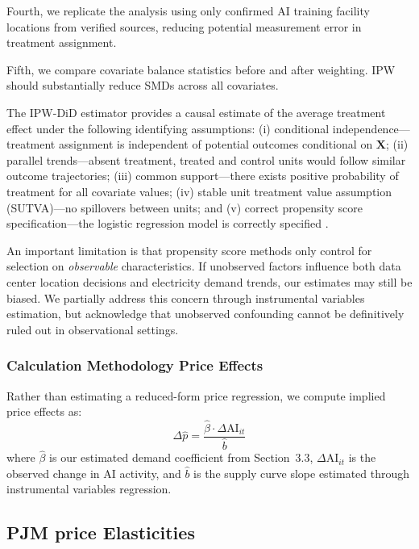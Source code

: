 \documentclass[a4paper,fleqn,longmktitle]{cas-sc}
\begin{document}
Fourth, we replicate the analysis using only confirmed AI training facility locations from verified sources, reducing potential measurement error in treatment assignment.

Fifth, we compare covariate balance statistics before and after weighting. IPW should substantially reduce SMDs across all covariates.

The IPW-DiD estimator provides a causal estimate of the average treatment effect under the following identifying assumptions: (i) conditional independence---treatment assignment is independent of potential outcomes conditional on $\mathbf{X}$; (ii) parallel trends---absent treatment, treated and control units would follow similar outcome trajectories; (iii) common support---there exists positive probability of treatment for all covariate values; (iv) stable unit treatment value assumption (SUTVA)---no spillovers between units; and (v) correct propensity score specification---the logistic regression model is correctly specified \citep{abadie2005semiparametric, callaway2021difference}.

An important limitation is that propensity score methods only control for selection on \emph{observable} characteristics. If unobserved factors influence both data center location decisions and electricity demand trends, our estimates may still be biased. We partially address this concern through instrumental variables estimation, but acknowledge that unobserved confounding cannot be definitively ruled out in observational settings.


\subsubsection{Calculation Methodology Price Effects}\label{CalcMethodologyPrice}

Rather than estimating a reduced-form price regression, we compute implied price effects as:
\begin{equation}
\Delta \hat{p} = \frac{\hat{\beta} \cdot \Delta \text{AI}_{it}}{\hat{b}}
\end{equation}
where $\hat{\beta}$ is our estimated demand coefficient from Section~3.3, $\Delta \text{AI}_{it}$ is the observed change in AI activity, and $\hat{b}$ is the supply curve slope estimated through instrumental variables regression.

\subsection{PJM price Elasticities}\label{PriceElasticityAppendix}
\end{document}
